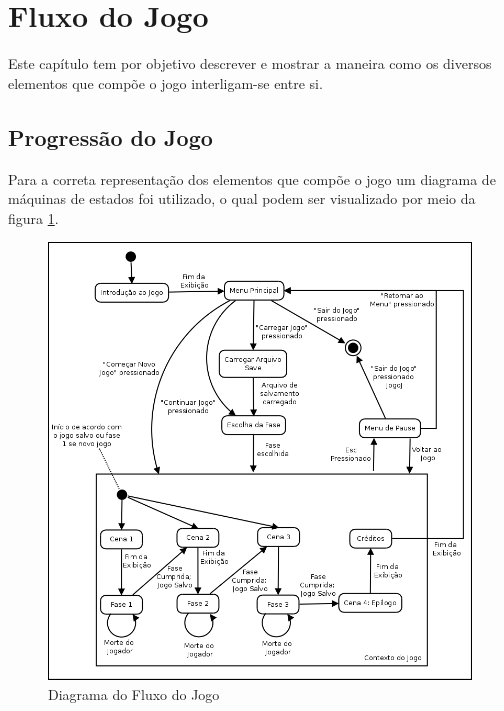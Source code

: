 \section{Fluxo do Jogo}
Este capítulo tem por objetivo descrever e mostrar a maneira como os diversos elementos que compõe o jogo interligam-se entre si.

\subsection{Progressão do Jogo}
Para a correta representação dos elementos que compõe o jogo um diagrama de máquinas de estados foi utilizado, o qual podem ser visualizado por meio da figura \ref{img:fluxo_jogo}.

\begin{figure}[!ht]
 \centering
 \includegraphics[scale=0.40]{fluxo_jogo.png}
 \caption{Diagrama do Fluxo do Jogo}
 \label{img:fluxo_jogo}
\end{figure}

